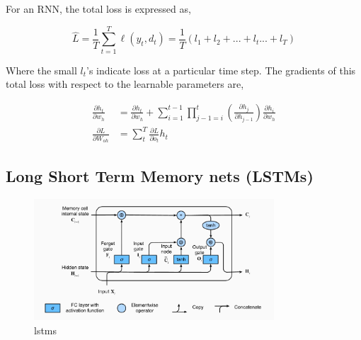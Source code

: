 \documentclass[12pt, letterpaper]{article}
\begin{document}
For an RNN, the total loss is expressed as,

\begin{equation}
    \hat{L} = \frac{1}{T} \sum_{t=1}^{T} \ell(y_t, d_t) = \frac{1}{T} (l_1 + l_2 + ... + l_t ... + l_T)
    \label{eqn: total loss rnn}
\end{equation}

Where the small $l_t$'s indicate loss at a particular time step. The gradients of this total loss with respect
to the learnable parameters are, 

\begin{align}
    \frac{\partial h_t}{\partial w_h} &= \frac{\partial h_t}{\partial w_h} + \sum_{i=1}^{t-1}\prod_{j-1=i}^{t} (\frac{\partial h_j}{\partial h_{j-1}}) \frac{\partial h_i}{\partial w_h}\\
    \frac{\partial L}{\partial W_{oh}} &= \sum_{t}^{T} \frac{\partial L}{\partial o_t} h_t
\end{align}

\subsection{Long Short Term Memory nets (LSTMs)}


\begin{figure}[htpb]
    \centering
    \includegraphics[width=0.8\textwidth]{lstms v1.png}
    \caption{lstms}
    \label{fig: lstms}
\end{figure}


\printbibliography
\end{document}

